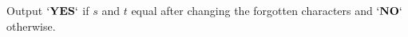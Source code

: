 Output $\bf{`YES`}$ if $s$ and $t$ equal after changing the forgotten characters and $\bf{`NO`}$ otherwise.